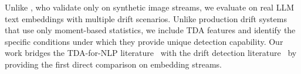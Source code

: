 Unlike \citet{basterrech2024unsupervised}, who validate only on synthetic image streams, we evaluate on real LLM text embeddings with multiple drift scenarios. Unlike production drift systems~\cite{khaki2023uncovering, greco2024driftlens} that use only moment-based statistics, we include TDA features and identify the specific conditions under which they provide unique detection capability. Our work bridges the TDA-for-NLP literature~\cite{gardinazzi2024persistent, wei2025shortphd} with the drift detection literature~\cite{khaki2023uncovering, sodar2023detecting} by providing the first direct comparison on embedding streams.
